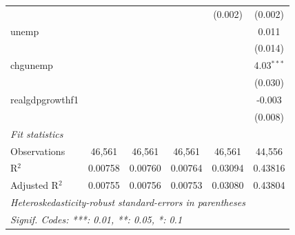\begin{tabular}{lccccc}
                   &               &               &               & (0.002)        & (0.002)\\   
   unemp           &               &               &               &                & 0.011\\   
                   &               &               &               &                & (0.014)\\   
   chgunemp        &               &               &               &                & 4.03$^{***}$\\   
                   &               &               &               &                & (0.030)\\   
   realgdpgrowthf1 &               &               &               &                & -0.003\\   
                   &               &               &               &                & (0.008)\\   
   \midrule
   \emph{Fit statistics}\\
   Observations    & 46,561        & 46,561        & 46,561        & 46,561         & 44,556\\  
   R$^2$           & 0.00758       & 0.00760       & 0.00764       & 0.03094        & 0.43816\\  
   Adjusted R$^2$  & 0.00755       & 0.00756       & 0.00753       & 0.03080        & 0.43804\\  
   \midrule \midrule
   \multicolumn{6}{l}{\emph{Heteroskedasticity-robust standard-errors in parentheses}}\\
   \multicolumn{6}{l}{\emph{Signif. Codes: ***: 0.01, **: 0.05, *: 0.1}}\\
\end{tabular}
\par\endgroup


